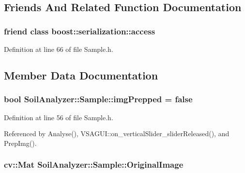 \subsection{Friends And Related Function Documentation}
\hypertarget{class_soil_analyzer_1_1_sample_ac98d07dd8f7b70e16ccb9a01abf56b9c}{}
\subsubsection[{boost\+::serialization\+::access}]{\setlength{\rightskip}{0pt plus 5cm}friend class boost\+::serialization\+::access\hspace{0.3cm}{\ttfamily [friend]}}\label{class_soil_analyzer_1_1_sample_ac98d07dd8f7b70e16ccb9a01abf56b9c}


Definition at line 66 of file Sample.\+h.



\subsection{Member Data Documentation}
\hypertarget{class_soil_analyzer_1_1_sample_ab025a26f7276128a5a974cae15b51dfc}{}
\subsubsection[{img\+Prepped}]{\setlength{\rightskip}{0pt plus 5cm}bool Soil\+Analyzer\+::\+Sample\+::img\+Prepped = false}\label{class_soil_analyzer_1_1_sample_ab025a26f7276128a5a974cae15b51dfc}


Definition at line 56 of file Sample.\+h.



Referenced by Analyse(), V\+S\+A\+G\+U\+I\+::on\+\_\+vertical\+Slider\+\_\+slider\+Released(), and Prep\+Img().

\hypertarget{class_soil_analyzer_1_1_sample_a0d6e6fca9e232a77329daf0b4b29c634}{}
\subsubsection[{Original\+Image}]{\setlength{\rightskip}{0pt plus 5cm}cv\+::\+Mat Soil\+Analyzer\+::\+Sample\+::\+Original\+Image}\label{class_soil_analyzer_1_1_sample_a0d6e6fca9e232a77329daf0b4b29c634}



